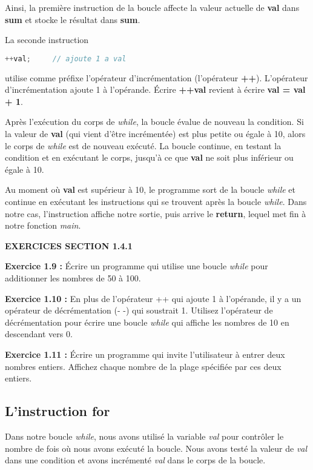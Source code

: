 Ainsi, la première instruction de la boucle affecte la valeur actuelle de \textbf{val} dans \textbf{sum} et stocke le résultat dans \textbf{sum}.

La seconde instruction

\medbreak
\begin{lstlisting}[language=C++]
	++val;     // ajoute 1 a val
\end{lstlisting}
\medbreak

utilise comme préfixe l'opérateur d'incrémentation (l'opérateur \textbf{++}). L'opérateur d'incrémentation ajoute 1 à l'opérande. Écrire \textbf{++val} revient à écrire \textbf{val = val + 1}.

Après l'exécution du corps de \textit{while}, la boucle évalue de nouveau la condition. Si la valeur de \textbf{val} (qui vient d'être incrémentée) est plus petite ou égale à 10, alors le corps de \textit{while} est de nouveau exécuté. La boucle continue, en testant la condition et en exécutant le corps, jusqu'à ce que \textbf{val} ne soit plus inférieur ou égale à 10.

Au moment où \textbf{val} est supérieur à 10, le programme sort de la boucle \textit{while} et continue en exécutant les instructions qui se trouvent après la boucle \textit{while}. Dans notre cas, l'instruction affiche notre sortie, puis arrive le \textbf{return}, lequel met fin à notre fonction \textit{main}.

\bigbreak

\textbf{EXERCICES SECTION 1.4.1}
\begin{shadebox}
	\textbf{Exercice 1.9 :} Écrire un programme qui utilise une boucle \textit{while} pour additionner les nombres de 50 à 100.
	
	\textbf{Exercice 1.10 :} En plus de l'opérateur ++ qui ajoute 1 à l'opérande, il y a un opérateur de décrémentation (- -) qui soustrait 1. Utilisez l'opérateur de décrémentation pour écrire une boucle \textit{while} qui affiche les nombres de 10 en descendant vers 0.
	
	\textbf{Exercice 1.11 :} Écrire un programme qui invite l'utilisateur à entrer deux nombres entiers. Affichez chaque nombre de la plage spécifiée par ces deux entiers.  
\end{shadebox}

\medbreak

\subsection{L'instruction \textbf{for}}
Dans notre boucle \textit{while}, nous avons utilisé la variable \textit{val} pour contrôler le nombre de fois où nous avons exécuté la boucle. Nous avons testé la valeur de \textit{val} dans une condition et avons incrémenté \textit{val} dans le corps de la boucle.

